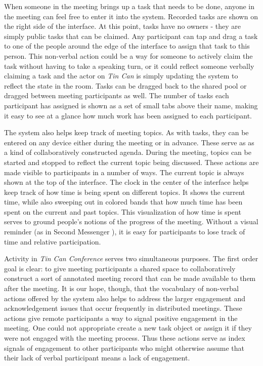 \documentclass{tufte-handout}
\begin{document}
When someone in the meeting brings up a task that needs to be done, anyone in the meeting can feel free to enter it into the system. Recorded tasks are shown on the right side of the interface. At this point, tasks have no owners - they are simply public tasks that can be claimed. Any participant can tap and drag a task to one of the people around the edge of the interface to assign that task to this person. This non-verbal action could be a way for someone to actively claim the task without having to take a speaking turn, or it could reflect someone verbally claiming a task and the actor on \emph{Tin Can} is simply updating the system to reflect the state in the room. Tasks can be dragged back to the shared pool or dragged between meeting participants as well. The number of tasks each participant has assigned is shown as a set of small tabs above their name, making it easy to see at a glance how much work has been assigned to each participant.

The system also helps keep track of meeting topics. As with tasks, they can be entered on any device either during the meeting or in advance. These serve as as a kind of collaboratively constructed agenda. During the meeting, topics can be started and stopped to reflect the current topic being discussed. These actions are made visible to participants in a number of ways. The current topic is always shown at the top of the interface. The clock in the center of the interface helps keep track of how time is being spent on different topics. It shows the current time, while also sweeping out in colored bands that how much time has been spent on the current and past topics. This visualization of how time is spent serves to ground people's notions of the progress of the meeting. Without a visual reminder (as in Second Messenger \citet{second_messenger}), it is easy for participants to lose track of time and relative participation.

Activity in \emph{Tin Can Conference} serves two simultaneous purposes. The first order goal is clear: to give meeting participants a shared space to collaboratively construct a sort of annotated meeting record that can be made available to them after the meeting. It is our hope, though, that the vocabulary of non-verbal actions offered by the system also helps to address the larger engagement and acknowledgement issues that occur frequently in distributed meetings. These actions give remote participants a way to signal positive engagement in the meeting. One could not appropriate create a new task object or assign it if they were not engaged with the meeting process. Thus these actions serve as index signals of engagement to other participants who might otherwise assume that their lack of verbal participant means a lack of engagement.
\end{document}
